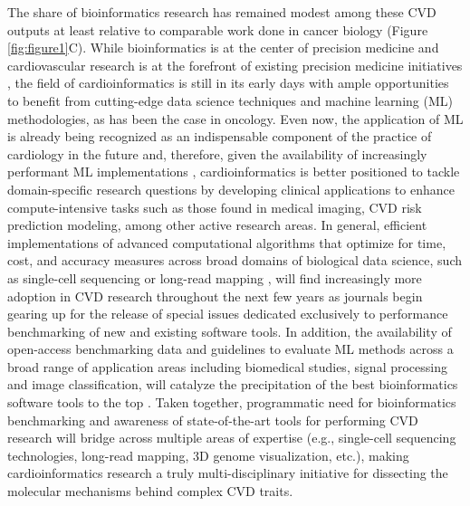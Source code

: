 \documentclass[letter]{bioinfo}
\begin{document}
The share of bioinformatics research has remained modest among these CVD outputs at least relative to comparable work done in cancer biology (Figure \ref{fig:figure1}C). While bioinformatics is at the center of precision medicine \citep{Gomez-Lopez:2017:Precision} and cardiovascular research is at the forefront of existing precision medicine initiatives \citep{Houser:2016:American,czbiohub:2018:Chan},
the field of cardioinformatics is still in its early days with ample opportunities to benefit from cutting-edge data science techniques and machine learning (ML) methodologies, as has been the case in oncology.  Even now, the application of ML is already being recognized as an indispensable component of the practice of cardiology in the future \citep{Shameer:2017:Translational,Shameer:2018:Machine} and, therefore, given the availability of increasingly performant ML implementations \citep{MLPerf:2018:MLPerf}, cardioinformatics is better positioned to tackle domain-specific research questions by developing clinical applications to enhance compute-intensive tasks such as those found in medical imaging, CVD risk prediction modeling, among other active research areas. In general, efficient implementations of advanced computational algorithms that optimize for time, cost, and accuracy measures across broad domains of biological data science, such as single-cell sequencing \citep{Becht:2018:Evaluation} or long-read mapping \citep{Li:2018:Minimap2}, will find increasingly more adoption in CVD research throughout the next few years as journals begin gearing up for the release of special issues dedicated exclusively to performance benchmarking of new and existing software tools.  In addition, the availability of open-access benchmarking data and guidelines to evaluate ML methods across a broad range of application areas including biomedical studies, signal processing and image classification, will catalyze the precipitation of the best bioinformatics software tools to the top \citep{Olson:2017:PMLB,Weber:2018:Essential}.  Taken together, programmatic need for bioinformatics benchmarking and awareness of state-of-the-art tools for performing CVD research will bridge across multiple areas of expertise (e.g., single-cell sequencing technologies, long-read mapping, 3D genome visualization, etc.), making cardioinformatics research a truly multi-disciplinary initiative for dissecting the molecular mechanisms behind complex CVD traits.   
\end{document}
